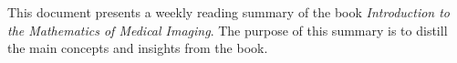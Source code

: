 This document presents a weekly reading summary of the book \textit{Introduction to the Mathematics of Medical Imaging}. 
The purpose of this summary is to distill the main concepts and insights from the book.